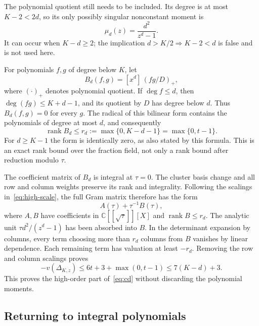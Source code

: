 \documentclass[11pt,letterpaper]{article}
\numberwithin{equation}{section}
\theoremstyle{remark}
\newcommand{\C}{\mathbb C}
\newcommand{\rank}{\operatorname{rank}}
\begin{document}
The polynomial quotient still needs to be included. Its degree is at most $K-2<2d$, so its only possibly singular nonconstant moment is
\begin{equation*}
 \mu_d(z)=\frac{d^2}{z^d-1}.
\end{equation*}
It can occur when $K-d\ge2$; the implication $d>K/2\Rightarrow K-2<d$ is false and is not used here.

For polynomials $f,g$ of degree below $K$, let
\begin{equation*}
 B_d(f,g)=[x^d]\,(fg/D)_+,
\end{equation*}
where $(\cdot)_+$ denotes polynomial quotient. If $\deg f\le d$, then $\deg(fg)\le K+d-1$, and its quotient by $D$ has degree below $d$. Thus $B_d(f,g)=0$ for every $g$. The radical of this bilinear form contains the polynomials of degree at most $d$, and consequently
\begin{equation}\label{eq:rank}
 \rank B_d\le r_d:=\max\{0,K-d-1\}=\max\{0,t-1\}.
\end{equation}
For $d\ge K-1$ the form is identically zero, as also stated by this formula. This is an exact rank bound over the fraction field, not only a rank bound after reduction modulo $\tau$.

The coefficient matrix of $B_d$ is integral at $\tau=0$. The cluster basis change and all row and column weights preserve its rank and integrality. Following the scalings in~\eqref{eq:high-scale}, the full Gram matrix therefore has the form
\begin{equation*}
 A(\tau)+\tau^{-1}B(\tau),
\end{equation*}
where $A,B$ have coefficients in $\C[[\sqrt\tau]][X]$ and $\rank B\le r_d$. The analytic unit $\tau d^2/(z^d-1)$ has been absorbed into $B$. In the determinant expansion by columns, every term choosing more than $r_d$ columns from $B$ vanishes by linear dependence. Each remaining term has valuation at least $-r_d$. Removing the row and column scalings proves
\begin{equation}\label{eq:high-order}
 -v(\Delta_{K,z})\le6t+3+\max(0,t-1)\le7(K-d)+3.
\end{equation}
This proves the high-order part of~\eqref{eq:cd} without discarding the polynomial moments.

\subsection{Returning to integral polynomials}
\end{document}
